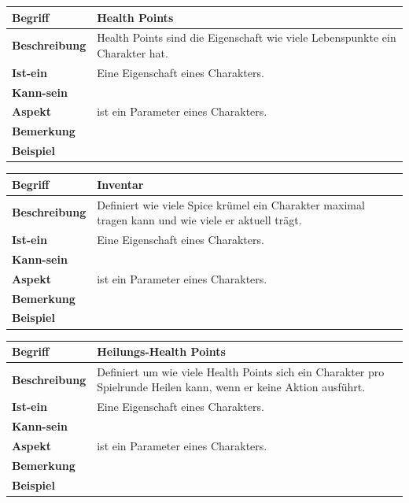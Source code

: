 \documentclass{uulm-assignment}
\begin{document}
\begin{tabularx}{16cm}{|l|X|}
\hline
\textbf{Begriff} & \textbf{Health Points} \\
\hline
\textbf{Beschreibung} & Health Points sind die Eigenschaft wie viele Lebenspunkte ein Charakter hat.\\
\hline
\textbf{Ist-ein} & Eine Eigenschaft eines Charakters.\\
\hline
\textbf{Kann-sein} & \\
\hline
\textbf{Aspekt} & ist ein Parameter eines Charakters. \\
\hline
\textbf{Bemerkung} & \\
\hline
\textbf{Beispiel} &  \\
\hline
\end{tabularx}

\begin{tabularx}{16cm}{|l|X|}
\hline
\textbf{Begriff} & \textbf{Inventar} \\
\hline
\textbf{Beschreibung} & Definiert wie viele Spice krümel ein Charakter maximal tragen kann und wie viele er aktuell trägt. \\
\hline
\textbf{Ist-ein} & Eine Eigenschaft eines Charakters.\\
\hline
\textbf{Kann-sein} & \\
\hline
\textbf{Aspekt} & ist ein Parameter eines Charakters. \\
\hline
\textbf{Bemerkung} & \\
\hline
\textbf{Beispiel} &  \\
\hline
\end{tabularx}

\begin{tabularx}{16cm}{|l|X|}
\hline
\textbf{Begriff} & \textbf{Heilungs-Health Points } \\
\hline
\textbf{Beschreibung} & Definiert um wie viele Health Points sich ein Charakter pro Spielrunde Heilen kann, wenn er keine Aktion ausführt. \\
\hline
\textbf{Ist-ein} & Eine Eigenschaft eines Charakters.\\
\hline
\textbf{Kann-sein} & \\
\hline
\textbf{Aspekt} & ist ein Parameter eines Charakters. \\
\hline
\textbf{Bemerkung} & \\
\hline
\textbf{Beispiel} &  \\
\hline
\end{tabularx}
\end{document}
